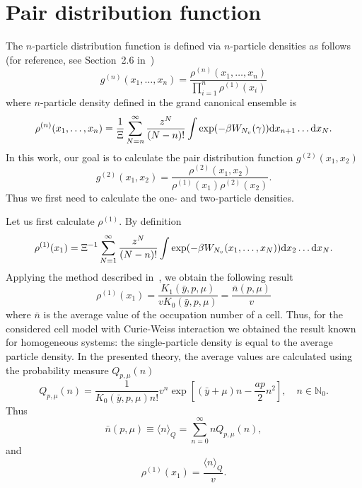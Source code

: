 \section{\label{sec:init-pair-distribution} Pair distribution function}
The $n$-particle distribution function is defined via $n$-particle densities as follows (for reference, see Section~2.6 in~\cite{hansen2013theory})
\begin{equation*}
	\label{def:g_n}
	g^{(n)}(x_1,\dotsc,x_n)=\frac{\rho^{(n)}(x_1,\dotsc,x_n)}{\prod_{i=1}^{n}\rho^{(1)}(x_i)}
\end{equation*}
where $n$-particle density defined in the grand canonical ensemble is
\begin{eqnarray*}
	\label{def:rho_n}
	\rho^{(n)}(x_1,\dotsc,x_n) = \frac{1}{\Xi}\sum_{N=n}^{\infty} \frac{z^N}{(N-n)!} \int\exp(-\beta W_{N_v}(\gamma)) {\rm d} x_{n+1} \dotsc {\rm d} x_N.
\end{eqnarray*}
In this work, our goal is to calculate the pair distribution function $g^{(2)}(x_1, x_2)$
\begin{equation*}
	g^{(2)}(x_1, x_2) = \frac{\rho^{(2)}(x_1, x_2)}{\rho^{(1)}(x_1) \rho^{(2)}(x_2)}.
\end{equation*}
Thus we first need to calculate the one- and two-particle densities.

Let us first calculate $\rho^{(1)}$. By definition
\begin{equation*}
	\rho^{(1)} (x_1) = \Xi^{-1} \sum_{N=1}^{\infty} \frac{z^N}{(N-n)!} \int \exp(-\beta W_{N_v}(x_1, \dotsc, x_N)) {\rm d} x_2 \dotsc {\rm d} x_N.
\end{equation*}
Applying the method described in~\cite{KKD2020}, we obtain the following result
\begin{equation*}
	\rho^{(1)} (x_1) = \frac{K_1(\bar{y}, p, \mu)}{v K_0(\bar{y},p,\mu)} = \frac{\bar{n}(p,\mu)}{v}
\end{equation*}
where $\bar{n}$ is the average value of the occupation number of a cell. Thus, for the considered cell model with Curie-Weiss interaction we obtained the result known for homogeneous systems: the single-particle density is equal to the average particle density. In the presented theory, the average values are calculated using the probability measure $Q_{p,\mu}(n)$
\begin{equation*}
	Q_{p,\mu}(n) = \frac{1}{K_0(\bar{y}, p, \mu) n!} v^n \exp\left[(\bar{y} + \mu)n - \frac{a p}{2}n^2 \right],
	\quad n \in \mathbb{N}_0.
\end{equation*}
Thus
\begin{equation*}
	\bar{n}(p, \mu) \equiv \langle n \rangle_{Q} = \sum_{n=0}^{\infty} n Q_{p, \mu}(n),
\end{equation*}
and 
\begin{equation}
	\rho^{(1)}(x_1) = \frac{\langle n \rangle_{Q}}{v}.
\end{equation}

